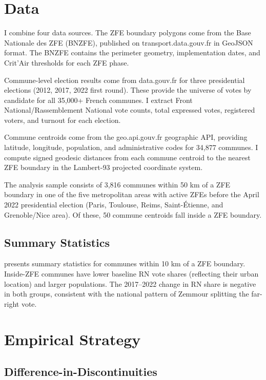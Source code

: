 \documentclass[12pt]{article}
\begin{document}
\section{Data}

I combine four data sources. The ZFE boundary polygons come from the Base Nationale des ZFE (BNZFE), published on transport.data.gouv.fr in GeoJSON format. The BNZFE contains the perimeter geometry, implementation dates, and Crit'Air thresholds for each ZFE phase.

Commune-level election results come from data.gouv.fr for three presidential elections (2012, 2017, 2022 first round). These provide the universe of votes by candidate for all 35,000+ French communes. I extract Front National/Rassemblement National vote counts, total expressed votes, registered voters, and turnout for each election.

Commune centroids come from the geo.api.gouv.fr geographic API, providing latitude, longitude, population, and administrative codes for 34,877 communes. I compute signed geodesic distances from each commune centroid to the nearest ZFE boundary in the Lambert-93 projected coordinate system.

The analysis sample consists of 3,816 communes within 50 km of a ZFE boundary in one of the five metropolitan areas with active ZFEs before the April 2022 presidential election (Paris, Toulouse, Reims, Saint-\'{E}tienne, and Grenoble/Nice area). Of these, 50 commune centroids fall inside a ZFE boundary.

\subsection{Summary Statistics}



 presents summary statistics for communes within 10 km of a ZFE boundary. Inside-ZFE communes have lower baseline RN vote shares (reflecting their urban location) and larger populations. The 2017--2022 change in RN share is negative in both groups, consistent with the national pattern of Zemmour splitting the far-right vote.

\section{Empirical Strategy}

\subsection{Difference-in-Discontinuities}
\end{document}
